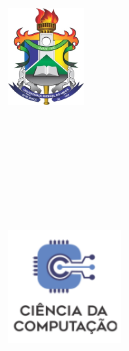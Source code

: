 %
%

\makeatletter
\begin{capa}

\begin{figure}
    \centering
    \hspace{-2.2cm}\begin{minipage}{.1\textwidth}
        \includegraphics[width=2cm]{./04-figuras/unifap.jpg}
        \end{minipage}\
    \hspace{0.65cm}
	\begin{minipage}{.86\textwidth}
	  \begin{center}
	  \large
	     \normalfont\scshape{\imprimirinstituicao}\\
        \normalfont\scshape{\imprimirprograma}\\
            \normalfont\scshape{\imprimirareaconcentracao}\\
        \end{center}
        \end{minipage}
    \hspace{0.1cm}
    \begin{minipage}{0.09\textwidth}
        \includegraphics[width=3cm]{./04-figuras/bccunifap.png}
        \end{minipage}
\end{figure}



\end{capa}
